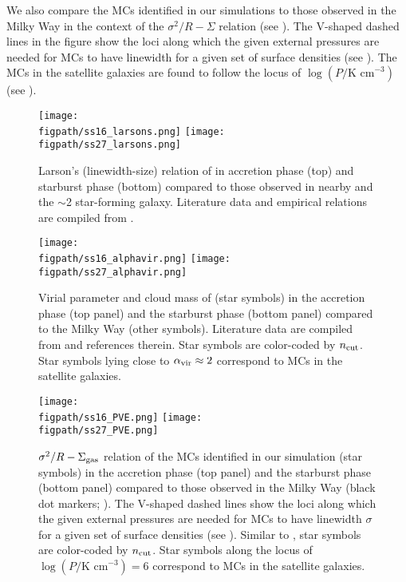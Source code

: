 \IfFileExists{emulateapjlegacy.cls}{\documentclass[iop]{emulateapjlegacy}}{\documentclass[iop]{emulateapj}}
\def\figpath{./Fig}
\begin{document}
We also compare the MCs identified in our simulations to
those observed in the Milky Way in the context of the $\sigma^2/R - \Sigma$ relation (see ). 
The V-shaped dashed lines in the figure show the loci along which the given external pressures are needed for
MCs to have linewidth for a given set of surface densities (see ).
The MCs in the satellite galaxies are found to follow the locus of $\log{(P/\textrm{K cm}^{-3})}$ (see ).


\begin{figure*}[htbp]
\centering
\texttt{[image: \\figpath/ss16\_larsons.png]}
\texttt{[image: \\figpath/ss27\_larsons.png]}
\caption{
Larson's (linewidth-size) relation of \flower in
accretion phase (top) and
starburst phase (bottom) compared to
those observed in nearby and the \z$\sim$2 star-forming galaxy.
Literature data and empirical relations are compiled from \citet{Larson81a, Heyer04a, Rosolowsky05a, Bolatto08a, Swinbank11a, Leroy15a}.
\label{fig:larsons_single}}
\end{figure*}


\begin{figure*}[htbp]
\centering
\texttt{[image: \\figpath/ss16\_alphavir.png]}
\texttt{[image: \\figpath/ss27\_alphavir.png]}
\caption{
Virial parameter and cloud mass of \flower (star symbols) in the accretion phase (top panel) 
and the starburst phase (bottom panel) compared to the 
Milky Way (other symbols).
Literature data are compiled from \citealt{Kauffmann17b} and references therein.
Star symbols are color-coded by $n_{\rm cut}$.
Star symbols lying close to $\alpha_{\rm vir}\approx2$ correspond to MCs in the satellite galaxies.
\label{fig:alpha16}}
\end{figure*}


\begin{figure*}[htbp]
\centering
\texttt{[image: \\figpath/ss16\_PVE.png]}
\texttt{[image: \\figpath/ss27\_PVE.png]}
\caption{
$\sigma^2/R - \Sigma_{\rm gas}$ relation of the MCs identified in our simulation (star symbols)
in the accretion phase (top panel) and the starburst phase (bottom panel)
compared to those observed in the Milky Way (black dot markers; \citealt{Heyer09a}).
The V-shaped dashed lines show the loci along which the given external pressures
are needed for MCs to have linewidth $\sigma$ for a given set of surface densities (see ).
Similar to , star symbols are color-coded by $n_{\rm cut}$.
Star symbols along the locus of $\log{(P/\textrm{K cm}^{-3}) = 6}$
correspond to MCs in the satellite galaxies.
\label{fig:alpha27}}
\end{figure*}
\end{document}
